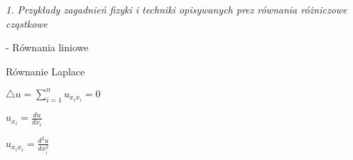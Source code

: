 \textit{1. Przykłady zagadnień fizyki i techniki opisywanych prez równania różniczowe cząstkowe}


- Równania liniowe

Równanie Laplace

$ \bigtriangleup u = \sum_{i=1}^{n} u_{x_ix_i} =0$

$ u_{x_i} = \frac{du}{dx_i}$

$ u_{x_i x_i} = \frac{d^2u}{dx_i^2}$